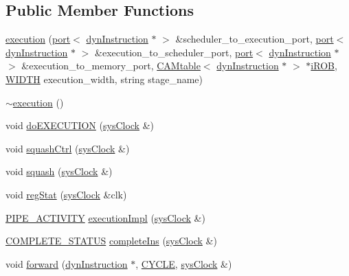 \subsection*{Public Member Functions}
\begin{DoxyCompactItemize}
\item 
\hyperlink{classexecution_a87b2844b03233ad768fa1ad67e1f93df}{execution} (\hyperlink{classport}{port}$<$ \hyperlink{classdynInstruction}{dynInstruction} $\ast$ $>$ \&scheduler\_\-to\_\-execution\_\-port, \hyperlink{classport}{port}$<$ \hyperlink{classdynInstruction}{dynInstruction} $\ast$ $>$ \&execution\_\-to\_\-scheduler\_\-port, \hyperlink{classport}{port}$<$ \hyperlink{classdynInstruction}{dynInstruction} $\ast$ $>$ \&execution\_\-to\_\-memory\_\-port, \hyperlink{classCAMtable}{CAMtable}$<$ \hyperlink{classdynInstruction}{dynInstruction} $\ast$ $>$ $\ast$\hyperlink{backend_2parser_8cpp_ad73ae25f81e6e99482f3fbd5ba9664ce}{iROB}, \hyperlink{global_2global_8h_a6fa2e24b8a418fa215e183264cbea3aa}{WIDTH} execution\_\-width, string stage\_\-name)
\item 
\hyperlink{classexecution_a686c28582542ecb0a4d41f9a649a6357}{$\sim$execution} ()
\item 
void \hyperlink{classexecution_a972207b1dde6a4bb8731c3fc0908bac6}{doEXECUTION} (\hyperlink{classsysClock}{sysClock} \&)
\item 
void \hyperlink{classexecution_a3e12895813ee78b1a7d2d10894db1204}{squashCtrl} (\hyperlink{classsysClock}{sysClock} \&)
\item 
void \hyperlink{classexecution_a243c30ebc13c7e2e6c1eb46a8fcac55e}{squash} (\hyperlink{classsysClock}{sysClock} \&)
\item 
void \hyperlink{classexecution_af6a859d27808b6db44c92b0ff79ef426}{regStat} (\hyperlink{classsysClock}{sysClock} \&clk)
\item 
\hyperlink{unit_2stage_8h_ab00e4188e8b8974fecb1dfd12764cbb1}{PIPE\_\-ACTIVITY} \hyperlink{classexecution_adc2d24703f3425df6107514535fea88b}{executionImpl} (\hyperlink{classsysClock}{sysClock} \&)
\item 
\hyperlink{unit_2stage_8h_a7de04de95175471455cf906d80af3968}{COMPLETE\_\-STATUS} \hyperlink{classexecution_a0c823fb6010268a0da3a706a9452d5e0}{completeIns} (\hyperlink{classsysClock}{sysClock} \&)
\item 
void \hyperlink{classexecution_a9271c55da8555444f0882c9027ab68a0}{forward} (\hyperlink{classdynInstruction}{dynInstruction} $\ast$, \hyperlink{global_2global_8h_a7e19a550ec11d1ed921deb20c22efb5b}{CYCLE}, \hyperlink{classsysClock}{sysClock} \&)
\end{DoxyCompactItemize}


